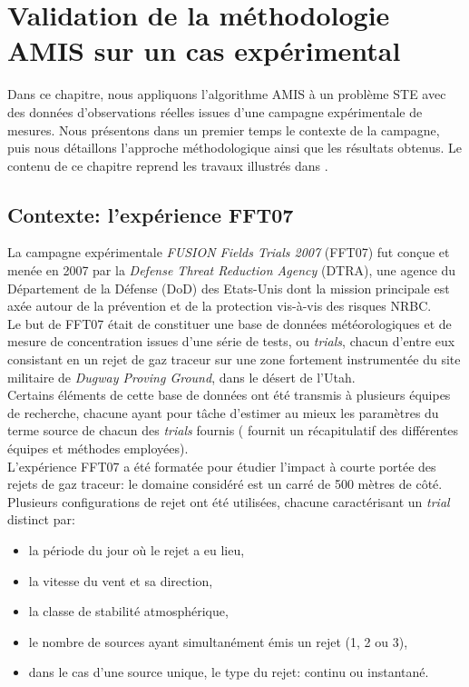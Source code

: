 \setcounter{chapter}{2}
\chapter{Validation de la méthodologie AMIS sur un cas expérimental}

Dans ce chapitre, nous appliquons l'algorithme AMIS à un problème STE avec des données d'observations réelles issues d'une campagne expérimentale de mesures. Nous présentons dans un premier temps le contexte de la campagne, puis nous détaillons l'approche méthodologique ainsi que les résultats obtenus. Le contenu de ce chapitre reprend les travaux illustrés dans \cite{Rajaona2015}.

\section{Contexte: l'expérience FFT07}

La campagne expérimentale \textit{FUSION Fields Trials 2007} (FFT07) fut conçue et menée en 2007 par la \textit{Defense Threat Reduction Agency} (DTRA), une agence du Département de la Défense (DoD) des Etats-Unis dont la mission principale est axée autour de la prévention et de la protection vis-à-vis des risques NRBC.\\

Le but de FFT07 était de constituer une base de données météorologiques et de mesure de concentration issues d'une série de tests, ou \textit{trials}, chacun d'entre eux consistant en un rejet de gaz traceur sur une zone fortement instrumentée du site militaire de \textit{Dugway Proving Ground}, dans le désert de l'Utah.\\
Certains éléments de cette base de données ont été transmis à plusieurs équipes de recherche, chacune ayant pour tâche d'estimer au mieux les paramètres du terme source de chacun des \textit{trials} fournis (\cite{Platt2010} fournit un récapitulatif des différentes équipes et méthodes employées).\\

L'expérience FFT07 a été formatée pour étudier l'impact à courte portée des rejets de gaz traceur: le domaine considéré est un carré de 500 mètres de côté. Plusieurs configurations de rejet ont été utilisées, chacune caractérisant un \textit{trial} distinct par:
\begin{itemize}
	\item la période du jour où le rejet a eu lieu,
	\item la vitesse du vent et sa direction,
	\item la classe de stabilité atmosphérique,
	\item le nombre de sources ayant simultanément émis un rejet (1, 2 ou 3),
	\item dans le cas d'une source unique, le type du rejet: continu ou instantané.\\
\end{itemize}

